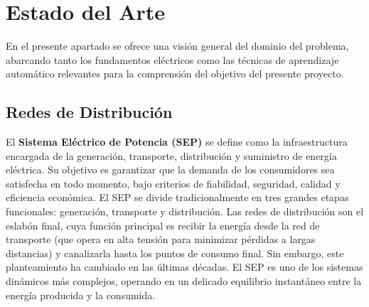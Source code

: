 \chapter{Estado del Arte}\label{cap:estadoDelArte}

En el presente apartado se ofrece una visión general del dominio del problema, abarcando tanto los fundamentos eléctricos como las técnicas de aprendizaje automático relevantes para la comprensión del objetivo del presente proyecto.

\section{Redes de Distribución}
El \textbf{Sistema Eléctrico de Potencia (SEP)} se define como la infraestructura encargada de la generación, transporte, distribución y suministro de energía eléctrica. Su objetivo es garantizar que la demanda de los consumidores sea satisfecha en todo momento, bajo criterios de fiabilidad, seguridad, calidad y eficiencia económica. El SEP se divide tradicionalmente en tres grandes etapas funcionales: generación, transporte y distribución. Las redes de distribución son el eslabón final, cuya función principal es recibir la energía desde la red de transporte (que opera en alta tensión para minimizar pérdidas a largas distancias) y canalizarla hasta los puntos de consumo final. Sin embargo, este planteamiento ha cambiado en las últimas décadas. El SEP es uno de los sistemas dinámicos más complejos, operando en un delicado equilibrio instantáneo entre la energía producida y la consumida.

